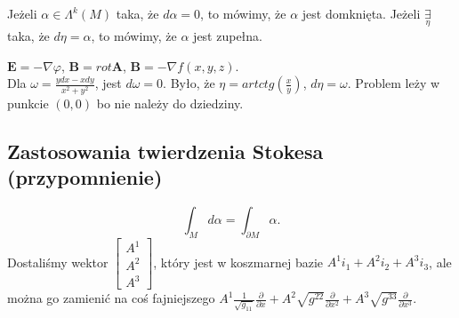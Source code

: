 \documentclass[../main.tex]{subfiles}
\begin{document}
    \begin{definicja}
        Jeżeli $\alpha\in\Lambda^k(M)$ taka, że $d\alpha = 0$, to mówimy, że $\alpha$ jest domknięta. Jeżeli $\underset{\eta}{\exists} $ taka, że $d\eta = \alpha$, to mówimy, że $\alpha$ jest zupełna.
    \end{definicja}
    \begin{przyklad}
        $\mathbf{E} = -\nabla\varphi$, $\mathbf{B} = rot \mathbf{A}$, $\mathbf{B} = -\nabla f(x,y,z)$.\\
        Dla $\omega = \frac{ydx - xdy}{x^2+y^2}$, jest $d\omega = 0$. Było, że $\eta = artctg(\frac{x}{y})$, $d\eta = \omega$. Problem leży w punkcie  $(0,0)$ bo nie należy do dziedziny.\\
    \end{przyklad}
    \subsection{Zastosowania twierdzenia Stokesa (przypomnienie)}
    \[
    \int_Md\alpha = \int_{\partial M}\alpha
    .\]
Dostaliśmy wektor $\begin{bmatrix} A^1\\A^2\\A^3 \end{bmatrix} $, który jest w koszmarnej bazie $A^1i_1 + A^2i_2 + A^3i_3$, ale można go zamienić na coś fajniejszego $A^1 \frac{1}{\sqrt{g_{11}} }\frac{\partial }{\partial x} + A^2\sqrt{g^{22}} \frac{\partial }{\partial x^2} + A^3 \sqrt{g^{33}}\frac{\partial }{\partial x^3}$.\\
\end{document}
